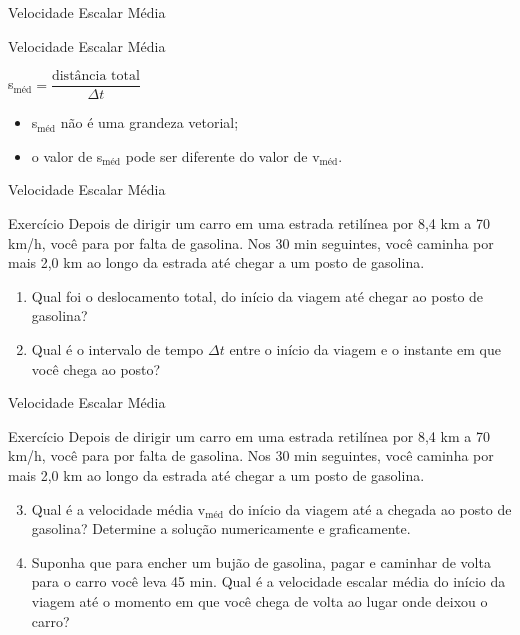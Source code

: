 \documentclass[xcolor=dvipsnames,table]{beamer}
\begin{document}
	\begin{frame}{Velocidade Escalar Média}
		\begin{block}{Velocidade Escalar Média}
			\begin{center}
				s$_{\mbox{méd}} = \dfrac{\mbox{distância total}}{\Delta t} $
			\end{center} 
			\begin{itemize}
				\item s$_{\mbox{méd}}$ não é uma grandeza vetorial;
				\item o valor de s$_{\mbox{méd}}$ pode ser diferente do valor de v$_{\mbox{méd}}$.
			\end{itemize}
		\end{block}
	\end{frame}

	\begin{frame}{Velocidade Escalar Média}
		\begin{block}{Exercício}
			Depois de dirigir um carro em uma estrada retilínea por	8,4 km a 70 km/h, você para por falta de gasolina. Nos 30 min seguintes, você caminha por mais 2,0 km ao longo da estrada até chegar a um posto de gasolina.
				\begin{enumerate} 
					\item Qual foi o deslocamento total, do início da viagem até chegar ao posto de gasolina?
					\item Qual é o intervalo de tempo $\Delta t$ entre o início da viagem e o instante em que você chega ao posto? 
				\end{enumerate}
			
		\end{block}
	\end{frame}
	
	\begin{frame}{Velocidade Escalar Média}
	\begin{block}{Exercício}
		Depois de dirigir um carro em uma estrada retilínea por	8,4 km a 70 km/h, você para por falta de gasolina. Nos 30 min seguintes, você caminha por mais 2,0 km ao longo da estrada até chegar a um posto de gasolina.
		\begin{enumerate}
			\setcounter{enumi}{2}
			\item Qual é a velocidade média v$_{\mbox{méd}}$ do início da viagem até a chegada ao posto de gasolina? Determine a solução numericamente e graficamente. 
			\item Suponha que para encher um bujão de gasolina, pagar e caminhar de volta para o carro você leva 45 min. Qual é a velocidade escalar média do início da viagem até o momento em que você chega de volta ao lugar onde deixou o carro?
		\end{enumerate}
	\end{block}
\end{frame}
\end{document}
